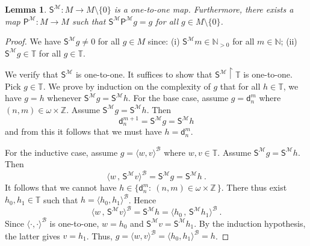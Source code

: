 \documentclass[10pt,a4paper, openany,  oldfontcommands]{memoir}
\newtheorem{lemma} [theorem] {Lemma}
\newtheorem{open problem} [theorem] {Open Problem}
\newtheorem{open question} [theorem] {Open Question}
\renewcommand{\mathrm}{\mathsf}
\begin{document}
\begin{lemma}
$  \mathrm{S}^{  \mathcal{M}  }    :  M  \to   M  \setminus  \lbrace 0  \rbrace  $  is a one-to-one map. 
Furthermore,  there exists a map $  \mathrm{P}^{  \mathcal{M}  }    :  M  \to   M   $  such that  
$   \mathrm{S}^{  \mathcal{M}  }     \mathrm{P}^{  \mathcal{M}  }  g = g  $  for all $  g \in  M \setminus  \lbrace 0 \rbrace  $.
\end{lemma}
\begin{proof}

We have  $  \mathrm{S}^{  \mathcal{M}  }  g  \neq 0 $  for all $  g \in  M  $ since: 
(i)   $  \mathrm{S}^{  \mathcal{M}  }   m   \in  \mathbb{N}_{ >0 }  $  for all $ m \in \mathbb{N} $; 
(ii)  $  \mathrm{S}^{  \mathcal{M}  }   g  \in  \mathbb{T}  $  for all $  g \in  \mathbb{T} $. 
 
We verify that     $  \mathrm{S}^{  \mathcal{M}  }   $  is one-to-one. 
It suffices to show that  $  \mathrm{S}^{  \mathcal{M}  }     \upharpoonright  \mathbb{T} $  is one-to-one. 
Pick  $  g  \in  \mathbb{T} $. 
We prove  by induction on the complexity of  $  g $ that for all $  h  \in  \mathbb{T} $,  
we have  $  g  = h  $ whenever $   \mathrm{S}^{  \mathcal{M}  }  g   =  \mathrm{S}^{  \mathcal{M}  }  h  $. 
For the base case, assume  $  g  =  \mathsf{d}^m_n $  where  $  (n, m )  \in  \omega  \times   \mathbb{Z} $. 
Assume $    \mathrm{S}^{  \mathcal{M}  }  g   =  \mathrm{S}^{  \mathcal{M}  }  h  $. 
Then 
\[
\mathsf{d}^{m+1}_n  =   \mathrm{S}^{  \mathcal{M}  }  g   =  \mathrm{S}^{  \mathcal{M}  }  h
\]
and from this  it follows that we must have  $  h  =  \mathsf{d}^m_n  $. 



For the inductive case,   assume $  g  =  \langle   w,  v  \rangle^{  \mathcal{B} }  $  where  $  w, v  \in  \mathbb{T} $. 
Assume    $   \mathrm{S}^{  \mathcal{M}  }  g   =  \mathrm{S}^{  \mathcal{M}  }  h  $. 
Then 
\[
\langle   w  \, ,  \,     \mathrm{S}^{  \mathcal{M}  }   v  \rangle^{  \mathcal{B} }  
=     \mathrm{S}^{  \mathcal{M}  }  g   =  \mathrm{S}^{  \mathcal{M}  }  h   
\     .
\]
It  follows that  we cannot have  $  h \in  \big\{  \mathsf{d}^m_n :   \  (n,m)  \in  \omega  \times  \mathbb{Z}  \,   \big\}  $. 
There thus exist  $  h_0, h_1  \in  \mathbb{T}  $  such that  
$  h  =  \langle  h_0,  h_1  \rangle^{  \mathcal{B} }  $. 
Hence 
\[
\langle   w  \, ,  \,     \mathrm{S}^{  \mathcal{M}  }   v  \rangle^{  \mathcal{B} }  
= \mathrm{S}^{  \mathcal{M}  }  h   
= 
\langle   h_0   \, ,  \,     \mathrm{S}^{  \mathcal{M}  }   h_1  \rangle^{  \mathcal{B} }  
\       .
\]
Since  $  \langle  \cdot  ,  \cdot    \rangle^{  \mathcal{B} }    $  is one-to-one,  
$  w  = h_0  $  and   $  \mathrm{S}^{  \mathcal{M}  }   v  =    \mathrm{S}^{  \mathcal{M}  }   h_1  $. 
By the induction hypothesis, the latter gives  $  v = h_1  $. 
Thus,  $  g  =   \langle  w,  v   \rangle^{  \mathcal{B} }  =      \langle  h_0,  h_1  \rangle^{  \mathcal{B} } =  h  $. 




\end{proof}
\end{document}
